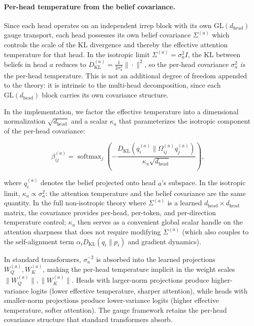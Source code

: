 \documentclass[twoside,11pt]{article}
\begin{document}
\paragraph{Per-head temperature from the belief covariance.}
Since each head operates on an independent irrep block with its own $\mathrm{GL}(d_{\text{head}})$ gauge transport, each head possesses its own belief covariance $\Sigma^{(a)}$ which controls the scale of the KL divergence and thereby the effective attention temperature for that head. In the isotropic limit $\Sigma^{(a)} = \sigma_a^2 I$, the KL between beliefs in head $a$ reduces to $D_{\mathrm{KL}}^{(a)} = \frac{1}{2\sigma_a^2}\|\cdot\|^2$, so the per-head covariance $\sigma_a^2$ \emph{is} the per-head temperature. This is not an additional degree of freedom appended to the theory: it is intrinsic to the multi-head decomposition, since each $\mathrm{GL}(d_{\text{head}})$ block carries its own covariance structure.

In the implementation, we factor the effective temperature into a dimensional normalization $\sqrt{d_{\text{head}}}$ and a scalar $\kappa_a$ that parameterizes the isotropic component of the per-head covariance:

\begin{equation}
\beta_{ij}^{(a)} = \operatorname{softmax}_j \left(-\frac{D_{\mathrm{KL}}(q_i^{(a)} \| \Omega_{ij}^{(a)} q_j^{(a)})}{\kappa_a \sqrt{d_{\text{head}}}}\right),
\label{eq:per_head_temperature}
\end{equation}

where $q_i^{(a)}$ denotes the belief projected onto head $a$'s subspace. In the isotropic limit, $\kappa_a \propto \sigma_a^2$: the attention temperature and the belief covariance are the same quantity. In the full non-isotropic theory where $\Sigma^{(a)}$ is a learned $d_{\text{head}} \times d_{\text{head}}$ matrix, the covariance provides per-head, per-token, and per-direction temperature control; $\kappa_a$ then serves as a convenient global scalar handle on the attention sharpness that does not require modifying $\Sigma^{(a)}$ (which also couples to the self-alignment term $\alpha_i D_{\mathrm{KL}}(q_i \| p_i)$ and gradient dynamics).

In standard transformers, $\sigma_a^{-2}$ is absorbed into the learned projections $W_Q^{(a)}, W_K^{(a)}$, making the per-head temperature implicit in the weight scales $\|W_Q^{(a)}\|, \|W_K^{(a)}\|$. Heads with larger-norm projections produce higher-variance logits (lower effective temperature, sharper attention), while heads with smaller-norm projections produce lower-variance logits (higher effective temperature, softer attention). The gauge framework retains the per-head covariance structure that standard transformers absorb.
\end{document}
